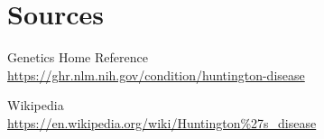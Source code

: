 \section{Sources}

\begin{description}

\item Genetics Home Reference\\
\url{https://ghr.nlm.nih.gov/condition/huntington-disease}

\item Wikipedia\\
\url{https://en.wikipedia.org/wiki/Huntington%27s_disease}

\end{description}


\newpage
